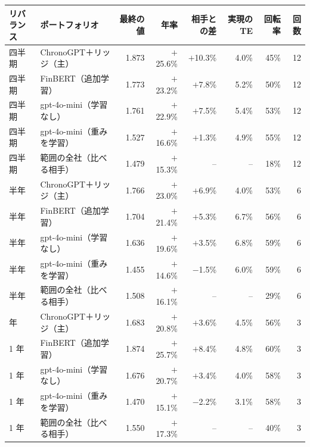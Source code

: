 \begin{tabular}{@{}llrrrrrr@{}}
\toprule
リバランス & ポートフォリオ & 最終の値 & 年率 & 相手との差 & 実現の TE & 回転率 & 回数 \\
\midrule
四半期 & ChronoGPT＋リッジ（主） & 1.873 & $+$25.6\% & $+$10.3\% & 4.0\% & 45\% & 12 \\
四半期 & FinBERT（追加学習） & 1.773 & $+$23.2\% & $+$7.8\% & 5.2\% & 50\% & 12 \\
四半期 & gpt-4o-mini（学習なし） & 1.761 & $+$22.9\% & $+$7.5\% & 5.4\% & 53\% & 12 \\
四半期 & gpt-4o-mini（重みを学習） & 1.527 & $+$16.6\% & $+$1.3\% & 4.9\% & 55\% & 12 \\
四半期 & 範囲の全社（比べる相手） & 1.479 & $+$15.3\% & -- & -- & 18\% & 12 \\
\addlinespace
半年 & ChronoGPT＋リッジ（主） & 1.766 & $+$23.0\% & $+$6.9\% & 4.0\% & 53\% & 6 \\
半年 & FinBERT（追加学習） & 1.704 & $+$21.4\% & $+$5.3\% & 6.7\% & 56\% & 6 \\
半年 & gpt-4o-mini（学習なし） & 1.636 & $+$19.6\% & $+$3.5\% & 6.8\% & 59\% & 6 \\
半年 & gpt-4o-mini（重みを学習） & 1.455 & $+$14.6\% & $-$1.5\% & 6.0\% & 59\% & 6 \\
半年 & 範囲の全社（比べる相手） & 1.508 & $+$16.1\% & -- & -- & 29\% & 6 \\
\addlinespace
1 年 & ChronoGPT＋リッジ（主） & 1.683 & $+$20.8\% & $+$3.6\% & 4.5\% & 56\% & 3 \\
1 年 & FinBERT（追加学習） & 1.874 & $+$25.7\% & $+$8.4\% & 4.8\% & 60\% & 3 \\
1 年 & gpt-4o-mini（学習なし） & 1.676 & $+$20.7\% & $+$3.4\% & 4.0\% & 58\% & 3 \\
1 年 & gpt-4o-mini（重みを学習） & 1.470 & $+$15.1\% & $-$2.2\% & 3.1\% & 58\% & 3 \\
1 年 & 範囲の全社（比べる相手） & 1.550 & $+$17.3\% & -- & -- & 40\% & 3 \\
\bottomrule
\end{tabular}
